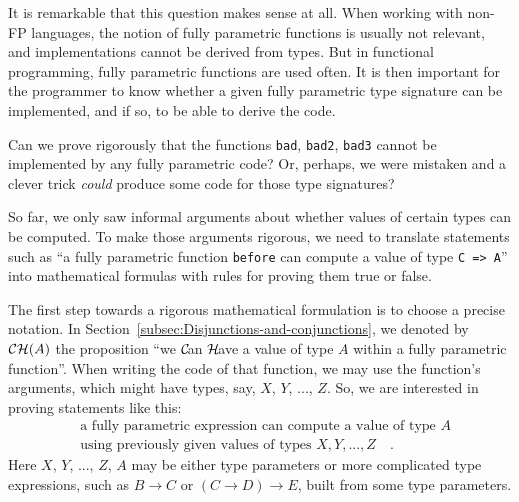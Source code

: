 It is remarkable that this question makes sense at all. When working
with non-FP languages, the notion of fully parametric functions is
usually not relevant, and implementations cannot be derived from types.
But in functional programming, fully parametric functions are used
often. It is then important for the programmer to know whether a given
fully parametric type signature can be implemented, and if so, to
be able to derive the code.

Can we prove rigorously that the functions \lstinline!bad!, \lstinline!bad2!,
\lstinline!bad3! cannot be implemented by any fully parametric code?
Or, perhaps, we were mistaken and a clever trick \emph{could} produce
some code for those type signatures? 

So far, we only saw informal arguments about whether values of certain
types can be computed. To make those arguments rigorous, we need to
translate statements such as \textsf{``}a fully parametric function \lstinline!before!
can compute a value of type \lstinline!C => A!\textsf{''} into mathematical
formulas with rules for proving them true or false.

The first step towards a rigorous mathematical formulation is to choose
a precise notation. In Section~\ref{subsec:Disjunctions-and-conjunctions},
we denoted by ${\cal CH}(A)$ the proposition \textsf{``}we ${\cal C}\!$an
${\cal H}\!$ave a value of type $A$ within a fully parametric function\textsf{''}.
When writing the code of that function, we may use the function\textsf{'}s
arguments, which might have types, say, $X$, $Y$, ..., $Z$. So,
we are interested in proving statements like this:
\begin{align}
 & \text{a fully parametric expression can compute a value of type }A\nonumber \\
 & \text{using previously given values of types }X,Y,...,Z\quad.\label{eq:ch-CH-proposition-def}
\end{align}
Here $X$, $Y$, ..., $Z$, $A$ may be either type parameters or
more complicated type expressions, such as $B\rightarrow C$ or $(C\rightarrow D)\rightarrow E$,
built from some type parameters.

